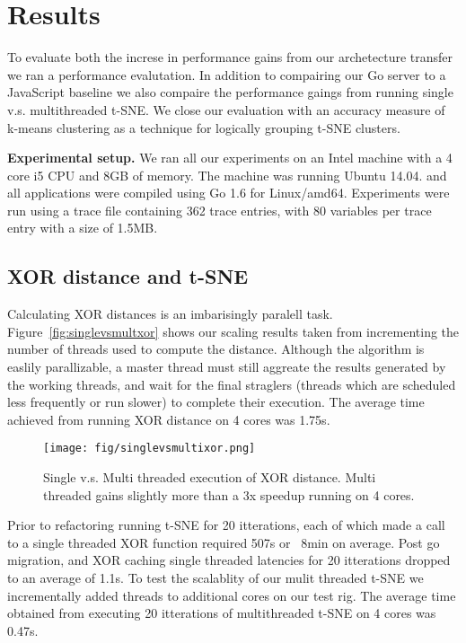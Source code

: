 \section{Results}
\label{sec:res}

To evaluate both the increse in performance gains from our
archetecture transfer we ran a performance evalutation. In addition to
compairing our Go server to a JavaScript baseline we also compaire the
performance gaings from running single v.s. multithreaded t-SNE. We
close our evaluation with an accuracy measure of k-means clustering as
a technique for logically grouping t-SNE clusters.

\textbf{Experimental setup.} We ran all our experiments on an Intel
machine with a 4 core i5 CPU and 8GB of memory. The machine was
running Ubuntu 14.04. and all applications were compiled using Go 1.6
for Linux/amd64. Experiments were run using a trace file containing
362 trace entries, with 80 variables per trace entry with a size of
1.5MB.

\subsection{XOR distance and t-SNE}

Calculating XOR distances is an imbarisingly paralell task.
Figure~\ref{fig:singlevsmultxor} shows our scaling results taken from
incrementing the number of threads used to compute the distance.
Although the algorithm is easlily parallizable, a master thread must
still aggreate the results generated by the working threads, and wait
for the final straglers (threads which are scheduled less frequently
or run slower) to complete their execution. The average time achieved
from running XOR distance on 4 cores was 1.75s.


\begin{figure}[t]
\centering
    \texttt{[image: fig/singlevsmultixor.png]}

    \caption{ Single v.s. Multi threaded execution of XOR distance.
    Multi threaded gains slightly more than a 3x speedup running on 4
    cores.}

    \label{fig:singlevsmultixor}
\end{figure}

Prior to refactoring running t-SNE for 20 itterations, each of which
made a call to a single threaded XOR function required 507s or ~8min
on average. Post go migration, and XOR caching single threaded
latencies for 20 itterations dropped to an average of 1.1s. To test
the scalablity of our mulit threaded t-SNE we incrementally added
threads to additional cores on our test rig. The average time obtained
from executing 20 itterations of multithreaded t-SNE on 4 cores was
0.47s.


